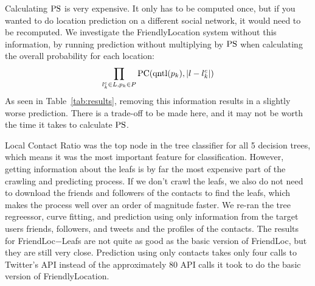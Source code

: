 Calculating $\operatorname{PS}$ is very expensive.
%
It only has to be computed once, but if you wanted to do location prediction on
a different social network, it would need to be recomputed.
%
We investigate the FriendlyLocation system without this information, by running
prediction without multiplying by $\operatorname{PS}$ when calculating the overall
probability for each location:
\[
    \prod_{l^c_k \in L,p_k \in P} \operatorname{PC}(\operatorname{qntl}(p_k),|l-l^c_k|)
\]
As seen in Table~\ref{tab:results}, removing this information results in a
slightly worse prediction.
%
There is a trade-off to be made here, and it may not be worth the time it takes
to calculate $\operatorname{PS}$.

Local Contact Ratio was the top node in the tree classifier for all 5 decision
trees, which means it was the most important feature for classification.
%
However, getting information about the leafs is by far the most expensive part
of the crawling and predicting process.
%
If we don't crawl the leafs, we also do not need to download the friends and
followers of the contacts to find the leafs, which makes the process well over
an order of magnitude faster.
%
We re-ran the tree regreessor, curve fitting, and prediction using only
information from the target users friends, followers, and tweets and the
profiles of the contacts.
%
The results for FriendLoc$-$Leafs are not quite as good as the basic version of
FriendLoc, but they are still very close.
%
Prediction using only contacts takes only four calls to Twitter's API instead
of the approximately 80 API calls it took to do the basic version of
FriendlyLocation.



